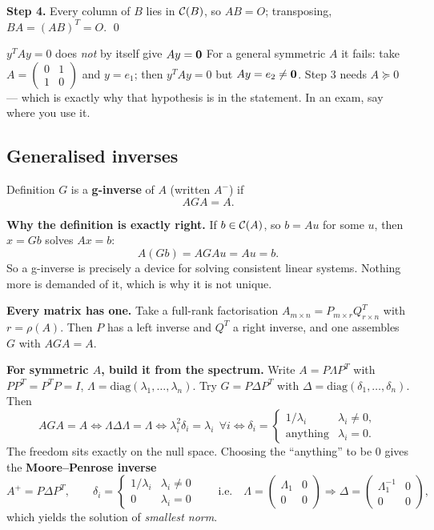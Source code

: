 \documentclass[11pt]{article}
\begin{document}
\textbf{Step 4.} Every column of $B$ lies in $\mathcal{C}(B)$, so $AB=O$; transposing,
$BA=(AB)^T=O$. \qed

\begin{confusion}{$y^TAy=0$ does \emph{not} by itself give $Ay=\mathbf{0}$}
For a general symmetric $A$ it fails: take $A=\begin{pmatrix}0&1\\1&0\end{pmatrix}$ and
$y=e_1$; then $y^TAy=0$ but $Ay=e_2\ne\mathbf{0}$. Step 3 needs $A\succeq0$ --- which is exactly
why that hypothesis is in the statement. In an exam, say where you use it.
\end{confusion}

\subsection{Generalised inverses}

\begin{idea}{Definition}
$G$ is a \textbf{g-inverse} of $A$ (written $A^-$) if
\[
  AGA=A .
\]
\end{idea}

\textbf{Why the definition is exactly right.} If $b\in\mathcal{C}(A)$, so $b=Au$ for some $u$, then
$x=Gb$ solves $Ax=b$:
\[
  A(Gb)=AGAu=Au=b .
\]
So a g-inverse is precisely a device for solving consistent linear systems. Nothing more is
demanded of it, which is why it is not unique.

\textbf{Every matrix has one.} Take a full-rank factorisation $A_{m\times n}=P_{m\times r}Q^T_{r\times n}$
with $r=\rho(A)$. Then $P$ has a left inverse and $Q^T$ a right inverse, and one assembles
$G$ with $AGA=A$.

\textbf{For symmetric $A$, build it from the spectrum.} Write $A=P\Lambda P^T$ with
$PP^T=P^TP=I$, $\Lambda=\text{diag}(\lambda_1,\dots,\lambda_n)$. Try $G=P\Delta P^T$ with
$\Delta=\text{diag}(\delta_1,\dots,\delta_n)$. Then
\[
  AGA=A \iff \Lambda\Delta\Lambda=\Lambda \iff \lambda_i^2\delta_i=\lambda_i\ \ \forall i
  \iff \delta_i=\begin{cases}1/\lambda_i & \lambda_i\neq 0,\\ \text{anything} & \lambda_i=0.\end{cases}
\]
The freedom sits exactly on the null space. Choosing the ``anything'' to be $0$ gives the
\textbf{Moore--Penrose inverse}
\[
  A^{+}=P\Delta P^T,\qquad \delta_i=\begin{cases}1/\lambda_i&\lambda_i\ne0\\ 0&\lambda_i=0\end{cases}
  \qquad\text{i.e.}\quad
  \Lambda=\begin{pmatrix}\Lambda_1&0\\0&0\end{pmatrix}\Rightarrow
  \Delta=\begin{pmatrix}\Lambda_1^{-1}&0\\0&0\end{pmatrix},
\]
which yields the solution of \emph{smallest norm}.
\end{document}
